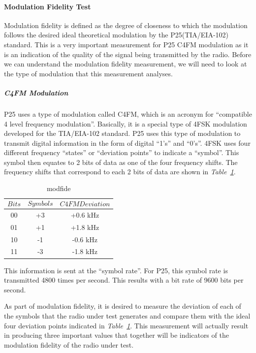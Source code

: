 \paragraph{Modulation Fidelity Test}
\- \indent
	Modulation fidelity is defined as the degree of closeness to which the modulation follows the desired ideal theoretical modulation by the P25(TIA/EIA-102) standard\cite{fidelity}. This is a very important measurement for P25 C4FM modulation as it is an indication of the quality of the signal being transmitted by the radio. Before we can understand the
modulation fidelity measurement, we will need to look at the type
of modulation that this measurement analyses.

\subparagraph{C4FM Modulation}
\- \indent
	P25 uses a type of modulation called C4FM, which is an acronym for “compatible 4 level frequency modulation”\cite{fidelity}. Basically, it is a special type of 4FSK modulation developed for the TIA/EIA-102 standard. P25 uses this type of modulation to transmit digital information in the form of digital “1’s” and “0’s”. 4FSK uses four different frequency “states” or “deviation points” to indicate a “symbol”. This symbol then equates to 2 bits of data as one of the four frequency shifts. The frequency shifts that correspond to each 2 bits of data are shown in \textit{Table~\ref{tab:modfide}}.
	
\begin{table}[H]
  \centering
 
    \begin{tabular}{c|c|c}
       $$Bits$$ & $$Symbols$$ & $$C4FM Deviation$$ \\ \hline
       00 & +3 & +0.6 kHz  \\ \hline
       01 & +1 & +1.8 kHz  \\ \hline
       10 & -1 & -0.6 kHz  \\ \hline
       11 & -3 & -1.8 kHz  
      
  \end{tabular}
  \caption{modfide}
  \label{tab:modfide}
\end{table}

	This information is sent at the “symbol rate”. For P25, this symbol rate is transmitted 4800 times per second. This results  with a bit rate of 9600 bits per second. 
		
	As part of modulation fidelity, it is desired to measure the deviation of each of the symbols that the radio under test generates and compare them with the ideal four deviation points indicated in \textit{Table~\ref{tab:modfide}}. This measurement will actually result in producing three important values that together will be indicators of the modulation fidelity of the radio under test.


